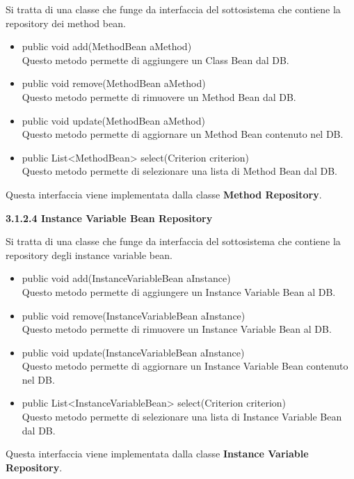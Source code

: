 \documentclass[11pt]{article}
\begin{document}
\begin{description}
				Si tratta di una classe che funge da interfaccia del sottosistema che contiene la repository dei method bean.
				
				\begin{itemize}
					\item public void add(MethodBean aMethod)\\
					Questo metodo permette di aggiungere un Class Bean dal DB.  
					\item public void remove(MethodBean aMethod)\\ 
					Questo metodo permette di rimuovere un Method Bean dal DB.  
					\item public void update(MethodBean aMethod) \\
					Questo metodo permette di aggiornare un Method Bean contenuto nel DB.
					\item public List<MethodBean> select(Criterion criterion)\\
					Questo metodo permette di selezionare una lista di Method Bean dal DB.
				\end{itemize}
				Questa interfaccia viene implementata dalla classe \textbf{Method Repository}.
				\item \textbf{3.1.2.4  Instance Variable Bean Repository}
				
				Si tratta di una classe che funge da interfaccia del sottosistema che contiene la repository degli instance variable bean.
				
				\begin{itemize}
					\item public void add(InstanceVariableBean aInstance)\\
					Questo metodo permette di aggiungere un Instance Variable Bean al DB.
					\item public void remove(InstanceVariableBean aInstance)\\
					Questo metodo permette di rimuovere un Instance Variable Bean al DB. 
					\item public void update(InstanceVariableBean aInstance) \\
					Questo metodo permette di aggiornare un Instance Variable Bean contenuto nel DB.
					\item public List<InstanceVariableBean> select(Criterion criterion)\\ 
					Questo metodo permette di selezionare una lista di Instance Variable Bean dal DB.
				\end{itemize}
			Questa interfaccia viene implementata dalla classe \textbf{Instance Variable Repository}.
			

\end{description}
\end{document}
